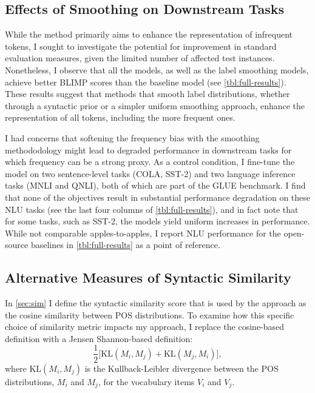 \subsection{Effects of Smoothing on Downstream Tasks}
While the method primarily aims to enhance the representation of infrequent tokens, I sought to investigate the potential for improvement in standard evaluation measures, given the limited number of affected test instances. Nonetheless, I observe that all the \smoothing models, as well as the label smoothing models, achieve better BLIMP scores than the baseline model (see \cref{tbl:full-results}). These results suggest that methods that smooth label distributions, whether through a syntactic prior or a simpler uniform smoothing approach, enhance the representation of all tokens, including the more frequent ones.

I had concerns that softening the frequency bias with the smoothing methododology might lead to degraded performance in downstream tasks for which frequency can be a strong proxy. As a control condition, I fine-tune the model on two sentence-level tasks (COLA, SST-2) and two language inference tasks (MNLI and QNLI), both of which are part of the GLUE \citep{wang2018glue} benchmark. I find that none of the \smoothing objectives result in substantial performance degradation on these NLU tasks (see the last four columns of \cref{tbl:full-results}), and in fact note that for some tasks, such as SST-2, the \smoothing models yield uniform increases in performance. While not comparable apples-to-apples, I report NLU performance for the open-source baselines in \cref{tbl:full-results} as a point of reference. 

\subsection{Alternative Measures of Syntactic Similarity}

In \cref{sec:sim} I define the syntactic similarity score that is used by the \smoothing approach as the cosine similarity between POS distributions. To examine how this specific choice of similarity metric impacts my approach, I replace the cosine-based definition with a Jensen Shannon-based definition:
$$ \frac{1}{2}\big[ \text{KL}(M_i, M_j ) + \text{KL}(M_j, M_i)\big],$$
where KL$(M_i, M_j)$ is the Kullback-Leibler divergence between the POS distributions, $M_i$ and $M_j$, for the vocabulary items $V_i$ and $V_j$.


